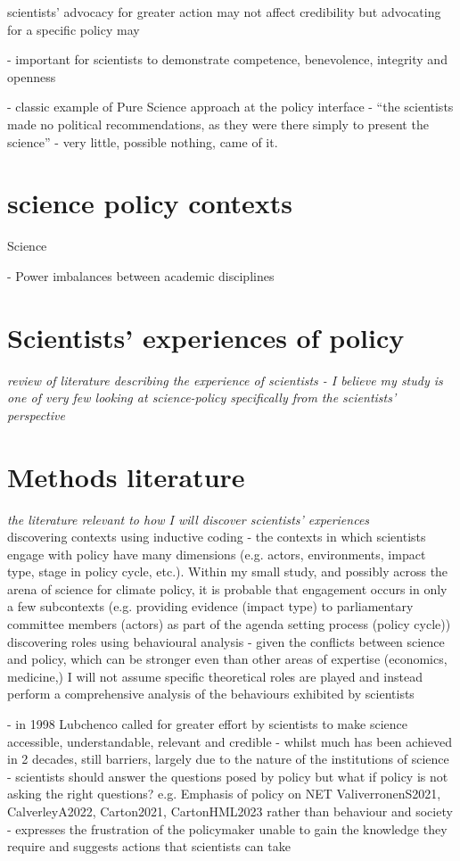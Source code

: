 \cite{ColognaKMBMO2024} scientists' advocacy for greater action may not affect credibility but advocating for a specific policy may

\cite{ColognaKMBMO2024} - important for scientists to demonstrate competence, benevolence, integrity and openness

\cite{Horton2022} - classic example of Pure Science approach at the policy interface - ``the scientists made no political recommendations, as they were there simply to present the science'' - very little, possible nothing, came of it.

\section{science policy contexts}
Science

\cite{BalvaneraJNOBCDGGKKMPSSW2020} - Power imbalances between academic disciplines

\section{Scientists’ experiences of policy}\label{sec:experiences}
\emph{review of literature describing the experience of scientists - I believe my study is one of very few looking at science-policy specifically from the scientists’ perspective}

\section{Methods literature}\label{sec:methodlit}
\emph{the literature relevant to how I will discover scientists’ experiences}\\
discovering contexts using inductive coding - the contexts in which scientists engage with policy have many dimensions (e.g. actors, environments, impact type, stage in policy cycle, etc.). Within my small study, and possibly across the arena of science for climate policy, it is probable that engagement occurs in only a few subcontexts (e.g. providing evidence (impact type) to parliamentary committee members (actors) as part of the agenda setting process (policy cycle))\\
discovering roles using behavioural analysis - given the conflicts between science and policy, which can be stronger even than other areas of expertise (economics, medicine,) I will not assume specific theoretical roles are played and instead perform a comprehensive analysis of the behaviours exhibited by scientists

\cite{LubchencoR2020} - in 1998 Lubchenco called for greater effort by scientists to make science accessible, understandable, relevant and credible - whilst much has been achieved in 2 decades, still barriers, largely due to the nature of the institutions of science
\cite{Gerber2023} - scientists should answer the questions posed by policy but what if policy is not asking the right questions? e.g. Emphasis of policy on NET ValiverronenS2021, CalverleyA2022, Carton2021, CartonHML2023 rather than behaviour and society
\cite{Bisbal2024} - expresses the frustration of the policymaker unable to gain the knowledge they require and suggests actions that scientists can take 